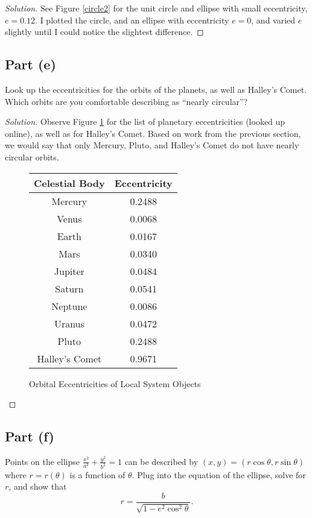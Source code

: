 \documentclass[letterpaper, 12pt]{amsart}
\theoremstyle{definition}  %
\begin{document}
		\begin{proof}[Solution]
			See Figure \ref{circle2} for the unit circle and ellipse with small eccentricity, $e = 0.12$.
			I plotted the circle, and an ellipse with eccentricity $e = 0$, and varied $e$ slightly until I could notice the slightest difference.
		\end{proof}

		\subsection*{Part (e)}
		Look up the eccentricities for the orbits of the planets, as well as Halley’s Comet. 
		Which orbits are you comfortable describing as ``nearly circular''?

		\begin{proof}[Solution]
			Observe Figure \ref{orbit} for the list of planetary eccentricities (looked up online), as well as for Halley's Comet.
			Based on work from the previous section, we would say that only Mercury, Pluto, and Halley's Comet do not have nearly circular orbits.

			\begin{figure}[h]
				\begin{tabular}{c|c}
					Celestial Body & Eccentricity \\
					\hline
					Mercury & 0.2488 \\
					Venus & 0.0068 \\
					Earth & 0.0167 \\
					Mars & 0.0340 \\
					Jupiter & 0.0484 \\
					Saturn & 0.0541 \\
					Neptune & 0.0086 \\
					Uranus & 0.0472 \\
					Pluto & 0.2488 \\
					Halley's Comet & 0.9671
				\end{tabular}
				\caption{Orbital Eccentricities of Local System Objects}
				\label{orbit}
			\end{figure}
		\end{proof}

		\subsection*{Part (f)}
		Points on the ellipse $\tfrac{x^{2}}{a^{2}} + \tfrac{y^{2}}{b^{2}} = 1$ can be described by $(x,y) = (r \cos\theta,r\sin\theta)$ where $r = r(\theta)$ is a function of $\theta$. 
		Plug into the equation of the ellipse, solve for $r$, and show that $$r = \frac{b}{\sqrt{1 - e^{2}\cos^{2}\theta}}.$$
\end{document}
